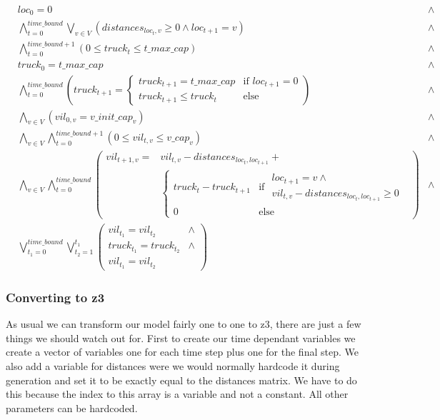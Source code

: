 \documentclass[12pt]{scrartcl}
\begin{document}
\begin{align*}
    & loc_0 = 0 & \wedge \\
    & \bigwedge_{t= 0}^{time\_bound} \bigvee_{v\in V}\left(distances_{loc_t, v} \geq 0 \wedge loc_{t+1} = v \right) & \wedge \\
    &\bigwedge_{t = 0}^{time\_bound + 1} \left(
        0 \leq truck_t \leq t\_max\_cap
    \right) & \wedge \\
    &truck_0 = t\_max\_cap & \wedge \\
    &\bigwedge_{t = 0}^{time\_bound} \left(
        truck_{t+1} = \begin{cases}
            truck_{t+1} = t\_max\_cap & \text{if } loc_{t+1} = 0 \\
            truck_{t+1} \leq truck_t & \text{else}
        \end{cases}
    \right) & \wedge \\
    &\bigwedge_{v\in V}\left( vil_{0,v} = v\_init\_cap_v\right) & \wedge\\
    &\bigwedge_{v\in V}\bigwedge_{t = 0}^{time\_bound + 1} \left(0 \leq vil_{t,v} \leq v\_cap_v\right)& \wedge\\
    &\bigwedge_{v\in V}\bigwedge_{t = 0}^{time\_bound} \left(\begin{array}{ll}
        vil_{t+1,v} = &vil_{t,v} - distances_{loc_t, loc_{t+1}} + \\
        &\begin{cases}
            truck_t - truck_{t+1} & \text{if } \begin{array}{l}
                loc_{t+1} = v \wedge\\
                vil_{t,v} - distances_{loc_t, loc_{t+1}} \geq 0
            \end{array}\\
            0 &\text{else}
        \end{cases}
    \end{array}
    \right) & \wedge \\
    &\bigvee_{t_1 = 0}^{time\_bound} \bigvee_{t_2 = 1}^{t_1}\left(
        \begin{array}{ll}
            vil_{t_1} = vil_{t_2} & \wedge \\
            truck_{t_1} = truck_{t_2} & \wedge \\
            vil_{t_1} = vil_{t_2}
        \end{array}
    \right)
\end{align*}

\subsubsection{Converting to z3} 
As usual we can transform our model fairly one to one to z3, there are just a few things we should watch out for. First to create our time dependant variables we create a vector of variables one for each time step plus one for the final step. We also add a variable for distances were we would normally hardcode it during generation and set it to be exactly equal to the distances matrix. We have to do this because the index to this array is a variable and not a constant. All other parameters can be hardcoded.
\end{document}
